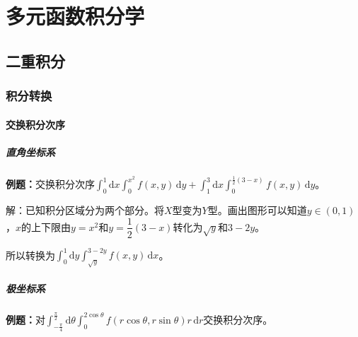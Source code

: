 \setcounter{tocdepth}{4}
\setcounter{secnumdepth}{4}
\renewcommand{\baselinestretch}{1.5}
\chapter{多元函数积分学}
\section{二重积分}

\subsection{积分转换}

\subsubsection{交换积分次序}

\paragraph{直角坐标系} \leavevmode \medskip

\textbf{例题：}交换积分次序$\int_0^1\textrm{d}x\int_0^{x^2}f(x,y)\,\textrm{d}y+\int_1^3\textrm{d}x\int_0^{\frac{1}{2}(3-x)}f(x,y)\,\textrm{d}y$。

解：已知积分区域分为两个部分。将$X$型变为$Y$型。画出图形可以知道$y\in(0,1)$，$x$的上下限由$y=x^2$和$y=\dfrac{1}{2}(3-x)$转化为$\sqrt{y}$和$3-2y$。

所以转换为$\int_0^1\textrm{d}y\int_{\sqrt{y}}^{3-2y}f(x,y)\,\textrm{d}x$。

\paragraph{极坐标系} \leavevmode \medskip

\textbf{例题：}对$\int_{-\frac{\pi}{4}}^{\frac{\pi}{2}}\textrm{d}\theta\int_0^{2\cos\theta}f(r\cos\theta,r\sin\theta)r\,\textrm{d}r$交换积分次序。

